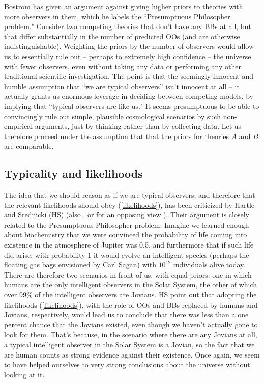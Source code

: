 \documentclass[12pt,letterpaper]{article}
\begin{document}
Bostrom \cite{bostrom} has given an argument against giving higher priors to theories with more observers in them, which he labels the ``Presumptuous Philosopher problem." 
Consider two competing theories that don't have any BBs at all, but that differ substantially in the number of predicted OOs (and are otherwise indistinguishable).
Weighting the priors by the number of observers would allow us to essentially rule out -- perhaps to extremely high confidence -- the universe with fewer observers, even without taking any data or performing any other traditional scientific investigation.
The point is that the seemingly innocent and humble assumption that ``we are typical observers'' isn't innocent at all -- it actually grants us enormous leverage in deciding between competing models, by implying that ``typical observers are like us." 
It seems presumptuous to be able to convincingly rule out simple, plausible cosmological scenarios by such non-empirical arguments, just by thinking rather than by collecting data.
Let us therefore proceed under the assumption that that the priors for theories $A$ and $B$ are comparable.

\subsection{Typicality and likelihoods}

The idea that we should reason as if we are typical observers, and therefore that the relevant likelihoods should obey (\ref{likelihoods}), has been criticized by Hartle and Srednicki (HS) \cite{Hartle:2007zv,Srednicki:2009vb} (also \cite{Azhar:2016mpg}, or for an opposing view \cite{Bousso:2007nd}).
Their argument is closely related to the Presumptuous Philosopher problem.
Imagine we learned enough about biochemistry that we were convinced the probability of life coming into existence in the atmosphere of Jupiter was 0.5, and furthermore that if such life did arise, with probability 1 it would evolve an intelligent species (perhaps the floating gas bags envisioned by Carl Sagan) with $10^{12}$ individuals alive today.
There are therefore two scenarios in front of us, with equal priors: one in which humans are the only intelligent observers in the Solar System, the other of which over 99\% of the intelligent observers are Jovians.
HS point out that adopting the likelihoods (\ref{likelihoods}), with the role of OOs and BBs replaced by humans and Jovians, respectively, would lead us to conclude that there was less than a one percent chance that the Jovians existed, even though we haven't actually gone to look for them.
That's because, in the scenario where there are any Jovians at all, a typical intelligent observer in the Solar System is a Jovian, so the fact that we are human counts as strong evidence against their existence.
Once again, we seem to have helped ourselves to very strong conclusions about the universe without looking at it.
\end{document}
